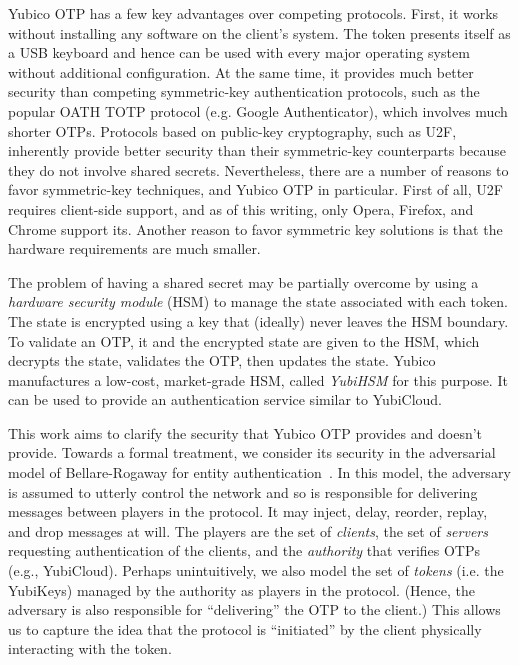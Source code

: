 Yubico OTP has a few key advantages over competing protocols.
%
First, it works without installing any software on the client's system. The
token presents itself as a USB keyboard and hence can be used with every major
operating system without additional configuration.
%
At the same time, it provides much better security than competing symmetric-key
authentication protocols, such as the popular OATH TOTP protocol (e.g. Google
Authenticator), which involves much shorter OTPs.
%
Protocols based on public-key cryptography, such as U2F, inherently provide
better security than their symmetric-key counterparts because they do not
involve shared secrets.
%
Nevertheless, there are a number of reasons to favor symmetric-key techniques,
and Yubico OTP in particular. First of all, U2F requires client-side support, and as
of this writing, only Opera, Firefox, and Chrome support its. Another reason to
favor symmetric key solutions is that the hardware requirements are much
smaller.
%
\fi

The problem of having a shared secret may be partially overcome by using
a \emph{hardware security module} (HSM) to manage the state associated with each
token. The state is encrypted using a key that (ideally) never leaves the HSM
boundary. To validate an OTP, it and the encrypted state are given to the HSM,
which decrypts the state, validates the OTP, then updates the state.
%
Yubico manufactures a low-cost, market-grade HSM, called \emph{YubiHSM} for this
purpose. It can be used to provide an authentication service similar to
YubiCloud.

This work aims to clarify the security that Yubico OTP provides and doesn't
provide. Towards a formal treatment, we consider its security in the adversarial
model of Bellare-Rogaway for entity authentication~\cite{bellare1993entity}.
%
In this model, the adversary is assumed to utterly control the network and so is
responsible for delivering messages between players in the protocol.
%
It may inject, delay, reorder, replay, and drop messages at will.
%
The players are the set of \emph{clients}, the set of \emph{servers} requesting
authentication of the clients, and the \emph{authority} that verifies OTPs
(e.g., YubiCloud).
%
Perhaps unintuitively, we also model the set of \emph{tokens} (i.e. the YubiKeys)
managed by the authority as players in the protocol. (Hence, the adversary is
also responsible for ``delivering'' the OTP to the client.) This allows us to
capture the idea that the protocol is ``initiated'' by the client physically
interacting with the token.

